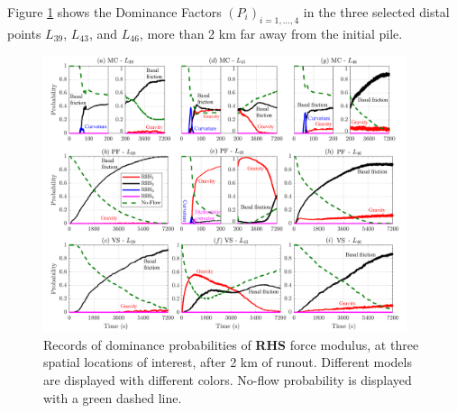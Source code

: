 \documentclass{article}
\begin{document}
Figure \ref{fig:Colima-Pr2} shows the Dominance Factors $(P_i)_{i=1,\dots,4}$ in the three selected distal points $L_{39}$, $L_{43}$, and $L_{46}$, more than 2 km far away from the initial pile.
\begin{figure}[H]
         \centering
        \includegraphics[width=0.95\textwidth]{BAF_VolcanDeColima/ForceContrib/Pr2_total.png}
        \caption{Records of dominance probabilities of \textbf{RHS} force modulus, at three spatial locations of interest, after 2 km of runout. Different models are displayed with different colors. No-flow probability is displayed with a green dashed line.}
        \label{fig:Colima-Pr2}
\end{figure}
\end{document}
